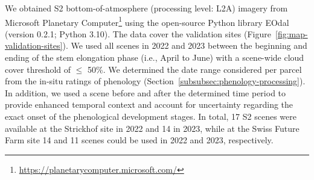 We obtained \gls{S2} bottom-of-atmosphere (processing level: L2A) imagery from Microsoft Planetary Computer\footnote{\url{https://planetarycomputer.microsoft.com/}} using the open-source Python library EOdal~\citep{graf_eodal_2022} (version 0.2.1; Python 3.10). The data cover the validation sites (Figure~\ref{fig:map-validation-sites}). We used all scenes in 2022 and 2023 between the beginning and ending of the stem elongation phase (i.e., April to June) with a scene-wide cloud cover threshold of $\le$ 50\%. We determined the date range considered per parcel from the in-situ ratings of phenology (Section~\ref{subsubsec:phenology-processing}). In addition, we used a scene before and after the determined time period to provide enhanced temporal context and account for uncertainty regarding the exact onset of the phenological development stages. In total, 17 \gls{S2} scenes were available at the Strickhof site in 2022 and 14 in 2023, while at the Swiss Future Farm site 14 and 11 scenes could be used in 2022 and 2023, respectively.
